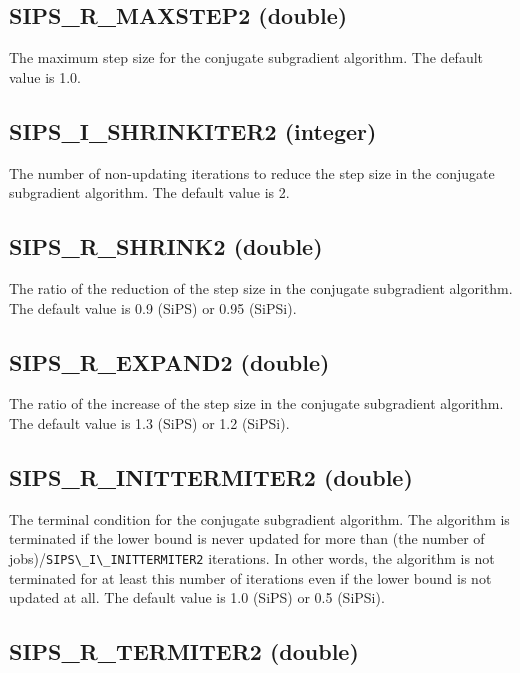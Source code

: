 \documentclass[a4paper]{book}
\begin{document}
\hypertarget{MAXSTEP2}{%
\subsection{SIPS\_R\_MAXSTEP2 (double)}
}

The maximum step size for the conjugate subgradient algorithm.
The default value is 1.0.

\hypertarget{SHRINKITER2}{%
\subsection{SIPS\_I\_SHRINKITER2 (integer)}
}

The number of non-updating iterations  to reduce the step size in the conjugate subgradient algorithm.
The default value is 2.

\hypertarget{SHRINK2}{%
\subsection{SIPS\_R\_SHRINK2 (double)}
}

The ratio of the reduction of the step size in the conjugate subgradient algorithm.
The default value is 0.9 (SiPS) or 0.95 (SiPSi).

\hypertarget{EXPAND2}{%
\subsection{SIPS\_R\_EXPAND2 (double)}
}

The ratio of the increase of the step size in the conjugate subgradient algorithm.
The default value is 1.3 (SiPS) or 1.2 (SiPSi).

\hypertarget{INITTERMITER2}{%
\subsection{SIPS\_R\_INITTERMITER2 (double)}
}

The terminal condition for the conjugate subgradient algorithm.
The algorithm is terminated if the lower bound is never updated for more than (the number of jobs)/\verb+SIPS\_I\_INITTERMITER2+ iterations.
In other words, the algorithm is not terminated for at least this number of iterations even if the lower bound is not updated at all.
The default value is 1.0 (SiPS) or 0.5 (SiPSi).

\hypertarget{TERMITER2}{%
\subsection{SIPS\_R\_TERMITER2 (double)}
}
\end{document}
